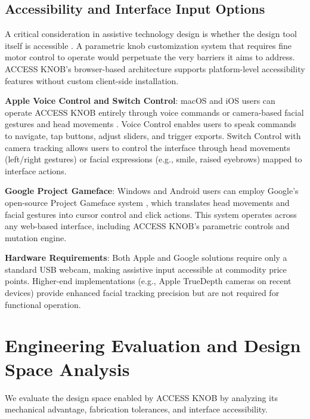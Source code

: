 \documentclass[manuscript,screen,review,anonymous]{acmart}
\begin{document}
\subsection{Accessibility and Interface Input Options}
A critical consideration in assistive technology design is whether the design tool itself is accessible \cite{mcmillan2023designing}. A parametric knob customization system that requires fine motor control to operate would perpetuate the very barriers it aims to address. ACCESS KNOB's browser-based architecture supports platform-level accessibility features without custom client-side installation.

\textbf{Apple Voice Control and Switch Control}: macOS and iOS users can operate ACCESS KNOB entirely through voice commands \cite{apple2024voicecontrol} or camera-based facial gestures and head movements \cite{apple2024switchcontrol}. Voice Control enables users to speak commands to navigate, tap buttons, adjust sliders, and trigger exports. Switch Control with camera tracking allows users to control the interface through head movements (left/right gestures) or facial expressions (e.g., smile, raised eyebrows) mapped to interface actions.

\textbf{Google Project Gameface}: Windows and Android users can employ Google's open-source Project Gameface system \cite{google2024gameface,googleblog2023gameface}, which translates head movements and facial gestures into cursor control and click actions. This system operates across any web-based interface, including ACCESS KNOB's parametric controls and mutation engine.

\textbf{Hardware Requirements}: Both Apple and Google solutions require only a standard USB webcam, making assistive input accessible at commodity price points. Higher-end implementations (e.g., Apple TrueDepth cameras on recent devices) provide enhanced facial tracking precision but are not required for functional operation.

\section{Engineering Evaluation and Design Space Analysis}

We evaluate the design space enabled by ACCESS KNOB by analyzing its mechanical advantage, fabrication tolerances, and interface accessibility.
\end{document}
